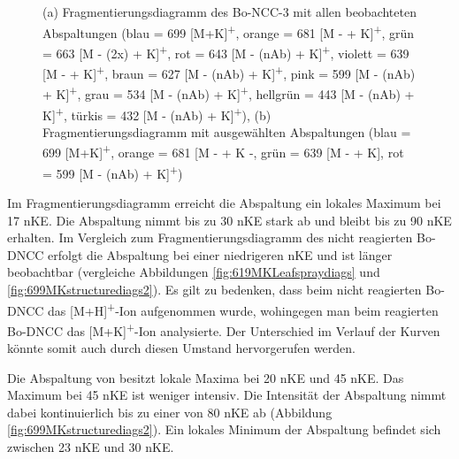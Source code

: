 \begin{figure}[!htbp]
  \caption[Fragmentierungsdiagramme des Reaktionsproduktes von Bo-DNCC, Quelle: Autor]{(a) Fragmentierungsdiagramm des Bo-NCC-3 mit allen beobachteten Abspaltungen (blau = 699 [M+K]\textsuperscript{+}, orange = 681 [M -  + K]\textsuperscript{+}, grün = 663 [M - (2x) + K]\textsuperscript{+}, rot = 643 [M - (\gls{nAb}) + K]\textsuperscript{+}, violett = 639 [M -  + K]\textsuperscript{+}, braun = 627 [M - (\gls{nAb}) + K]\textsuperscript{+}, pink = 599 [M - (\gls{nAb}) + K]\textsuperscript{+}, grau = 534 [M - (\gls{nAb}) + K]\textsuperscript{+}, hellgrün = 443 [M - (\gls{nAb}) + K]\textsuperscript{+}, türkis = 432 [M - (\gls{nAb}) + K]\textsuperscript{+}), (b) Fragmentierungsdiagramm mit ausgewählten Abspaltungen (blau = 699 [M+K]\textsuperscript{+}, orange = 681 [M -  + K -, grün = 639 [M -  + K], rot = 599 [M - (\gls{nAb}) + K]\textsuperscript{+})}
\end{figure} 

Im Fragmentierungsdiagramm erreicht die  Abspaltung ein lokales Maximum bei 17 \gls{nKE}. Die Abspaltung nimmt bis zu 30 \gls{nKE} stark ab und bleibt bis zu 90 \gls{nKE} erhalten. Im Vergleich zum Fragmentierungsdiagramm des nicht reagierten Bo-DNCC erfolgt die  Abspaltung bei einer niedrigeren \gls{nKE} und ist länger beobachtbar (vergleiche Abbildungen \ref{fig:619MKLeafspraydiags} und \ref{fig:699MKstructurediags2}). Es gilt zu bedenken, dass beim nicht reagierten Bo-DNCC das [M+H]\textsuperscript{+}-Ion aufgenommen wurde, wohingegen man beim reagierten Bo-DNCC das [M+K]\textsuperscript{+}-Ion analysierte. Der Unterschied im Verlauf der Kurven könnte somit auch durch diesen Umstand hervorgerufen werden.

Die Abspaltung von  besitzt lokale Maxima bei 20 \gls{nKE} und 45 \gls{nKE}. Das Maximum bei 45 \gls{nKE} ist weniger intensiv. Die Intensität der Abspaltung nimmt dabei kontinuierlich bis zu einer von 80 \gls{nKE} ab (Abbildung \ref{fig:699MKstructurediags2}). Ein lokales Minimum der Abspaltung befindet sich zwischen 23 \gls{nKE} und 30 \gls{nKE}. \\



